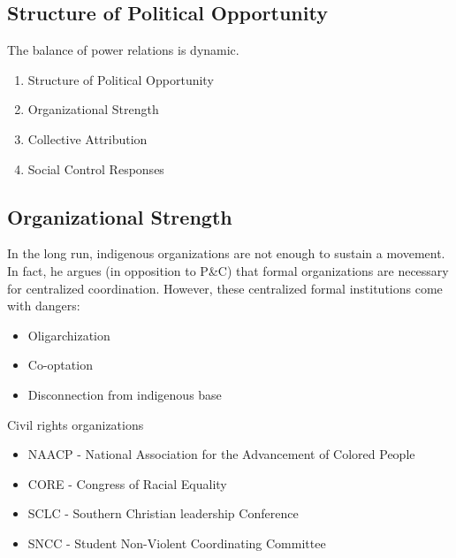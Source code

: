 \subsection{Structure of Political Opportunity}
The balance of power relations is dynamic.
\begin{enumerate}
    \item Structure of Political Opportunity
    \item Organizational Strength
    \item Collective Attribution
    \item Social Control Responses
\end{enumerate}

\subsection{Organizational Strength}
In the long run, indigenous organizations are not enough to sustain a movement.
In fact, he argues (in opposition to P\&C) that formal organizations are necessary for centralized coordination.
However, these centralized formal institutions come with dangers:
\begin{itemize}
    \item Oligarchization
    \item Co-optation
    \item Disconnection from indigenous base
\end{itemize}


Civil rights organizations
\begin{itemize}
    \item NAACP - National Association for the Advancement of Colored People
    \item CORE - Congress of Racial Equality
    \item SCLC - Southern Christian leadership Conference
    \item SNCC - Student Non-Violent Coordinating Committee
\end{itemize}
